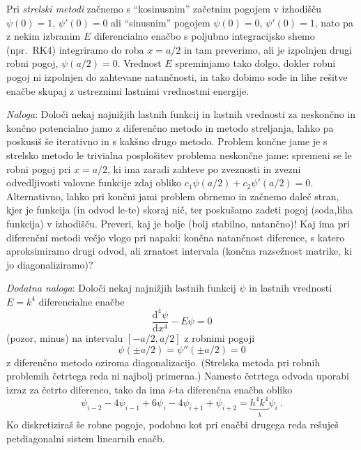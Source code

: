 \documentclass[slovene,11pt,a4paper]{article}
\newcommand{\ddd}{\mathrm{d}}
\newcommand{\Dd}[3][{}]{\frac{\ddd^{#1} #2}{\ddd #3^{#1}}}
\begin{document}
\smallskip

Pri {\sl strelski metodi\/} začnemo s ``kosinusnim'' začetnim pogojem
v izhodišču $\psi(0)=1$, $\psi'(0)=0$ ali ``sinusnim'' pogojem
$\psi(0)=0$, $\psi'(0)=1$, nato pa z nekim izbranim $E$ diferencialno
enačbo s poljubno integracijsko shemo (npr.~RK4) integriramo do roba
$x=a/2$ in tam preverimo, ali je izpolnjen drugi robni pogoj, $\psi(a/2)=0$.
Vrednost $E$ spreminjamo tako dolgo, dokler robni pogoj ni izpolnjen do
zahtevane natančnosti, in tako dobimo sode in lihe rešitve enačbe
skupaj z ustreznimi lastnimi vrednostmi energije.

\medskip

{\it Naloga\/}: Določi nekaj najnižjih lastnih funkcij in lastnih
vrednosti za
neskončno in končno potencialno jamo z diferenčno metodo in metodo streljanja, lahko pa poskusiš še iterativno in  s kakšno drugo metodo. 
Problem končne jame je s strelsko metodo le trivialna posplošitev
problema neskončne jame: spremeni se le robni pogoj pri $x=a/2$,
ki ima zaradi zahteve po zveznosti in zvezni odvedljivosti valovne
funkcije zdaj obliko $c_1\psi(a/2) + c_2\psi'(a/2) = 0$. 
Alternativno, lahko pri končni jami problem obrnemo in začnemo daleč stran, kjer je funkcija 
(in odvod le-te) skoraj nič, ter poskušamo zadeti  pogoj (soda,liha funkcija) v izhodišču. Preveri,
kaj je bolje (bolj stabilno, natančno)!
Kaj ima pri diferenčni metodi večjo vlogo pri napaki:
končna natančnost diference, s katero aproksimiramo drugi odvod,
ali zrnatost intervala (končna razsežnost matrike, ki jo
diagonaliziramo)?

\bigskip

{\it Dodatna naloga\/}: Določi nekaj najnižjih lastnih funkcij $\psi$
in lastnih vrednosti $E=k^4$ diferencialne enačbe
\begin{equation*}
\Dd[4]{\psi}{x} - E\psi = 0
\end{equation*}
(pozor, minus) na intervalu $[-a/2,a/2]$ z robnimi pogoji
\begin{equation*}
\psi(\pm a/2) = \psi''(\pm a/2) = 0
\end{equation*}
z diferenčno metodo oziroma diagonalizacijo.  (Strelska metoda
pri robnih problemih četrtega reda ni najbolj primerna.)
Namesto četrtega odvoda uporabi izraz za četrto diferenco,
tako da ima $i$-ta diferenčna enačba obliko
\begin{equation*}
\psi_{i-2} - 4\psi_{i-1} + 6\psi_i - 4\psi_{i+1} + \psi_{i+2}
= \underbrace{h^4k^4}_\lambda \psi_i \>.  
\end{equation*}
Ko diskretiziraš še robne pogoje, podobno kot pri enačbi
drugega reda rešuješ petdiagonalni sistem linearnih enačb.
\end{document}
